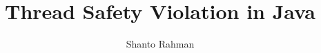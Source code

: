 \documentclass[sigconf,review,anonymous]{acmart}    %
\begin{document}

\title{Thread Safety Violation in Java}



\author{Shanto Rahman}
\UTAffiliation
{}


\begin{abstract}

\end{abstract}

\maketitle





%





\balance

\end{document}
